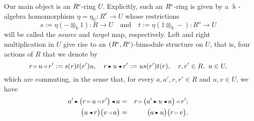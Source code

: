 \documentclass[reqno, a4paper, 10pt]{amsart}
\numberwithin{equation}{section}
\theoremstyle{plain}
\theoremstyle{definition}
\theoremstyle{remark}
\begin{document}
Our main object is an ${{R^{\rm e}}}$-ring $U$.
Explicitly, such an ${{R^{\rm e}}}$-ring is given by a $\Bbbk$-algebra 
homomorphism 
$
		  \eta=\eta_U : R^\mathrm{e} \rightarrow U
$ 
whose restrictions
\begin{equation}
\label{wind&rain}
		  {s}:= \eta( - \otimes_{\Bbbk} 1) : 
		  R \to U 
		  \quad \mbox{and} \quad 
		  {t} := \eta(1 \otimes_{\Bbbk} -) : 
		  {{R^{o}}} \to U
\end{equation}
will be called the {\em source} and {\em
target} map, respectively. Left and right multiplication in $U$
give rise to an 
$({{R^{\rm e}}},{{R^{\rm e}}})$-bimodule structure on $U$,
that is, four  actions of $R$
that we denote by 
\begin{equation*}\label{bimod-lmod}
		  r {{\,\raise1pt\hbox{$\scriptscriptstyle{\rhd}$} \, }} u {{\,\raise1pt\hbox{$\scriptscriptstyle{\lhd}$} \, }} r' :={s}(r)t(r')u,\quad 
		  r {{\,\raise1pt\hbox{$\scriptscriptstyle{\blacktriangleright}$} \, }} u {{\,\raise1pt\hbox{$\scriptscriptstyle{\blacktriangleleft}$} \, }} r'
		  :=u{s}(r')t(r), 
		  \quad r,r'\in R, \ u \in U,
\end{equation*}
which are commuting, in the sense that, for every $a, a', r, r' \in R$ and $u,v \in U$, we have 
\begin{eqnarray}
\label{pouvoir}
a' {{\,\raise1pt\hbox{$\scriptscriptstyle{\blacktriangleright}$} \, }}{\big( { r {{\,\raise1pt\hbox{$\scriptscriptstyle{\rhd}$} \, }} u {{\,\raise1pt\hbox{$\scriptscriptstyle{\lhd}$} \, }} r'} \big)} {{\,\raise1pt\hbox{$\scriptscriptstyle{\blacktriangleleft}$} \, }} a &=& r {{\,\raise1pt\hbox{$\scriptscriptstyle{\rhd}$} \, }} {\big( {a'{{\,\raise1pt\hbox{$\scriptscriptstyle{\blacktriangleright}$} \, }} u {{\,\raise1pt\hbox{$\scriptscriptstyle{\blacktriangleleft}$} \, }} a} \big)} {{\,\raise1pt\hbox{$\scriptscriptstyle{\lhd}$} \, }} r'; \\
\nonumber
{\big( {u {{\,\raise1pt\hbox{$\scriptscriptstyle{\blacktriangleleft}$} \, }} r} \big)} {\big( { v {{\,\raise1pt\hbox{$\scriptscriptstyle{\lhd}$} \, }} a} \big)} &=& {\big( {a {{\,\raise1pt\hbox{$\scriptscriptstyle{\blacktriangleright}$} \, }} u} \big)} {\big( {r {{\,\raise1pt\hbox{$\scriptscriptstyle{\rhd}$} \, }} v} \big)}. 
\end{eqnarray}
\end{document}
